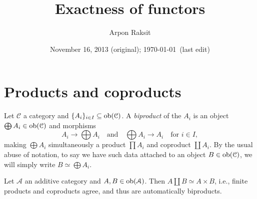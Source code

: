 


\title{Exactness of functors}
\author{Arpon Raksit}
\date{November 16, 2013 (original); \today\ (last edit)}


\maketitle
\thispagestyle{fancy}


\renewcommand{\A}{\mathcal{A}}
\renewcommand{\B}{\mathcal{B}}
\renewcommand{\C}{\mathcal{C}}


\section{Products and coproducts}

\begin{definition}
  \label{biproduct}
  Let $\C$ a category and $\{A_i\}_{i \in I} \subseteq \ob(\C)$. A
  \emph{biproduct} of the $A_i$ is an object $\bigoplus A_i \in
  \ob(\C)$ and morphisms
  \[
  \textstyle{A_i \to \bigoplus A_i \quad\text{and}\quad \bigoplus A_i
    \to A_i \quad \text{for }i \in I,}
  \]
  making $\bigoplus A_i$ simultaneously a product $\prod A_i$ and
  coproduct $\coprod A_i$. By the usual abuse of notation, to say we
  have such data attached to an object $B \in \ob(\C)$, we will simply
  write $B \simeq \bigoplus A_i$.
\end{definition}

\begin{lemma}
  \label{coproduct-biproduct}
  Let $\A$ an additive category and $A,B \in \ob(\A)$. Then $A \amalg
  B \simeq A \times B$, i.e., finite products and coproducts agree,
  and thus are automatically biproducts.
\end{lemma}


